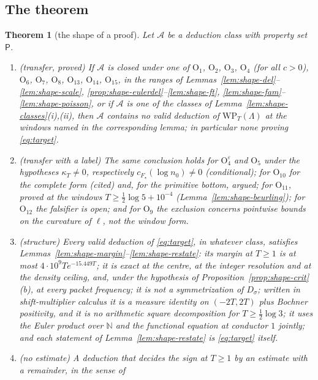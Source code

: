\documentclass[11pt]{amsart}
\newtheorem{theorem}{Theorem}[section]
\theoremstyle{definition}
\theoremstyle{remark}
\newcommand{\N}{\mathbb N}
\begin{document}
\subsection{The theorem}

\begin{theorem}[the shape of a proof]\label{thm:shape}
Let $\mathcal A$ be a deduction class with property set $\mathsf P$.
\begin{enumerate}
\item[(A)] \textup{(transfer, proved)} If $\mathcal A$ is closed under one of $\mathrm O_1$, $\mathrm O_2$, $\mathrm O_3$, $\mathrm O_4$ (for
all $c>0$), $\mathrm O_6$, $\mathrm O_7$, $\mathrm O_8$, $\mathrm O_{13}$, $\mathrm O_{14}$, $\mathrm O_{15}$, in the ranges of
Lemmas~\ref{lem:shape-del}--\ref{lem:shape-scale}, \ref{prop:shape-eulerdel}--\ref{lem:shape-ft}, \ref{lem:shape-fam}--\ref{lem:shape-poisson},
or if $\mathcal A$ is one of the classes of Lemma~\ref{lem:shape-classes}(i),(ii), then $\mathcal A$ contains no valid deduction of
$\mathrm{WP}_T(\Lambda)$ at the windows named in the corresponding lemma; in particular none proving \eqref{eq:target}.
\item[(A$'$)] \textup{(transfer with a label)} The same conclusion holds for $\mathrm O_4^\varepsilon$ and $\mathrm O_5$ under the
hypotheses $\kappa_T\ne0$, respectively $c_{F_\star}(\log n_0)\ne0$ (conditional); for $\mathrm O_{10}$ for the complete form (cited) and,
for the primitive bottom, argued; for $\mathrm O_{11}$, proved at the windows $T\ge\frac12\log5+10^{-4}$ (Lemma~\ref{lem:shape-beurling}); for $\mathrm O_{12}$ the falsifier is open; and for $\mathrm O_9$ the exclusion
concerns pointwise bounds on the curvature of $\ell$, not the window form.
\item[(B)] \textup{(structure)} Every valid deduction of \eqref{eq:target}, in whatever class, satisfies
Lemmas~\ref{lem:shape-margin}--\ref{lem:shape-restate}: its margin at $T\ge1$ is at most $4\cdot10^9Te^{-15.449T}$; it is exact at the
centre, at the integer resolution and at the density ceiling, and, under the hypothesis of Proposition~\ref{prop:shape-crit}(b), at every
packet frequency; it is not a symmetrization of $D_\sigma$; written in shift-multiplier calculus it is a measure identity on $(-2T,2T)$
plus Bochner positivity, and it is no arithmetic square decomposition for $T\ge\frac12\log3$; it uses the Euler product over $\N$ and the
functional equation at conductor $1$ jointly; and each statement of Lemma~\ref{lem:shape-restate} is \eqref{eq:target} itself.
\item[(B$'$)] \textup{(no estimate)} A deduction that decides the sign at $T\ge1$ by an estimate with a remainder, in the sense of

\end{enumerate}
\end{theorem}
\end{document}

